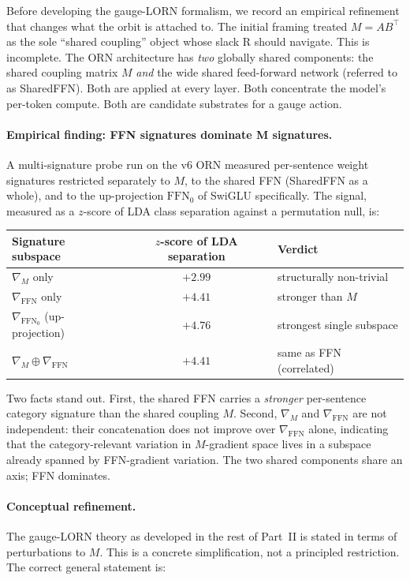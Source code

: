 \documentclass[11pt, a4paper]{article}
\theoremstyle{plain}
\theoremstyle{definition}
\theoremstyle{remark}
\begin{document}
Before developing the gauge-LORN formalism, we record an empirical refinement that changes what the orbit is attached to.
The initial framing treated $M = AB^{\!\top}$ as the sole ``shared coupling'' object whose slack R should navigate.
This is incomplete.
The ORN architecture has \emph{two} globally shared components: the shared coupling matrix $M$ \emph{and} the wide shared feed-forward network (referred to as SharedFFN).
Both are applied at every layer.
Both concentrate the model's per-token compute.
Both are candidate substrates for a gauge action.

\paragraph{Empirical finding: FFN signatures dominate M signatures.}
A multi-signature probe run on the v6 ORN measured per-sentence weight signatures restricted separately to $M$, to the shared FFN (SharedFFN as a whole), and to the up-projection $\mathrm{FFN}_{0}$ of SwiGLU specifically.
The signal, measured as a $z$-score of LDA class separation against a permutation null, is:

\begin{center}
\small
\begin{tabular}{l c l}
\toprule
Signature subspace & $z$-score of LDA separation & Verdict \\
\midrule
$\nabla_M$ only                              & $+2.99$ & structurally non-trivial \\
$\nabla_{\mathrm{FFN}}$ only                 & $+4.41$ & stronger than $M$ \\
$\nabla_{\mathrm{FFN}_{0}}$ (up-projection)  & $+\mathbf{4.76}$ & strongest single subspace \\
$\nabla_M \oplus \nabla_{\mathrm{FFN}}$      & $+4.41$ & same as FFN (correlated) \\
\bottomrule
\end{tabular}
\end{center}

Two facts stand out.
First, the shared FFN carries a \emph{stronger} per-sentence category signature than the shared coupling $M$.
Second, $\nabla_M$ and $\nabla_{\mathrm{FFN}}$ are not independent: their concatenation does not improve over $\nabla_{\mathrm{FFN}}$ alone, indicating that the category-relevant variation in $M$-gradient space lives in a subspace already spanned by FFN-gradient variation.
The two shared components share an axis; FFN dominates.

\paragraph{Conceptual refinement.}
The gauge-LORN theory as developed in the rest of Part~II is stated in terms of perturbations to $M$.
This is a concrete simplification, not a principled restriction.
The correct general statement is:
\end{document}
